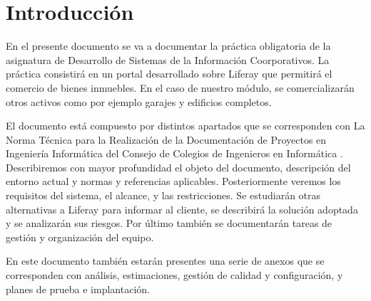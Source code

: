 \chapter{Introducción}

\par En el presente documento se va a documentar la práctica obligatoria de la asignatura de Desarrollo de Sistemas de la Información Coorporativos. La práctica consistirá en un portal desarrollado sobre Liferay que permitirá el comercio de bienes inmuebles. En el caso de nuestro módulo, se comercializarán otros activos como por ejemplo garajes y edificios completos.

\par El documento está compuesto por distintos apartados que se corresponden con La Norma Técnica para la Realización de la Documentación de Proyectos en Ingeniería Informática del Consejo de Colegios de Ingenieros en Informática \cite{IMPRO:CCII}. Describiremos con mayor profundidad el objeto del documento, descripción del entorno actual y normas y referencias aplicables. Posteriormente veremos los requisitos del sistema, el alcance, y las restricciones. Se estudiarán otras alternativas a Liferay para informar al cliente, se describirá la solución adoptada y se analizarán sus riesgos. Por último también se documentarán tareas de gestión y organización del equipo.

\par En este documento también estarán presentes una serie de anexos que se corresponden con análisis, estimaciones, gestión de calidad y configuración, y planes de prueba e implantación.
